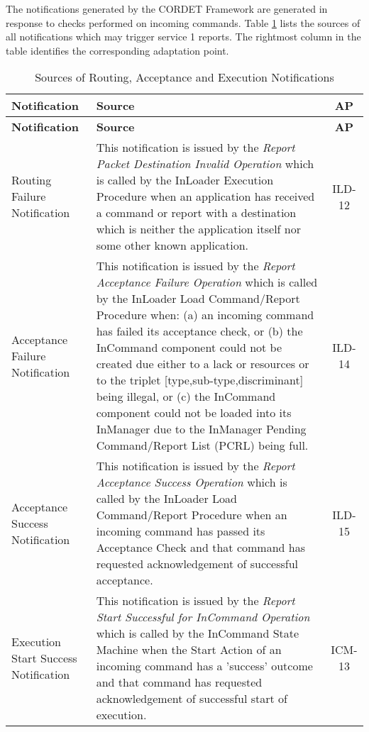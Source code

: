 \documentclass{pnp_article}
\begin{document}
The notifications generated by the CORDET Framework are generated in response to checks performed on incoming commands. Table \ref{tab:sourcesNotif} lists the sources of all notifications which may trigger service 1 reports. The rightmost column in the table identifies the corresponding adaptation point.



\begin{longtable}{|>{\raggedright\arraybackslash}p{2.1cm}|>{\raggedright\arraybackslash}p{9.8cm}|c|}
\caption{Sources of Routing, Acceptance and Execution Notifications}\label{tab:sourcesNotif} \\
\hline
\rowcolor{light-gray}
\textbf{Notification} & \textbf{Source} & \textbf{AP} \\
\hline\hline
\endfirsthead
\rowcolor{light-gray}
\textbf{Notification} & \textbf{Source} & \textbf{AP} \\
\hline\hline
\endhead
Routing Failure Notification & This notification is issued by the \textit{Report Packet Destination Invalid Operation} which is called by the InLoader Execution Procedure when an application has received a command or report with a destination which is neither the application itself nor some other known application. & ILD-12 \\
\hline
Acceptance Failure Notification & This notification is issued by the \textit{Report Acceptance Failure Operation} which is called by the InLoader Load Command/Report Procedure when: (a) an incoming command has failed its acceptance check, or (b) the InCommand component could not be created due either to a lack or resources or to the triplet [type,sub-type,discriminant] being illegal, or (c) the InCommand component could not be loaded into its InManager due to the InManager Pending Command/Report List (PCRL) being full. & ILD-14 \\
\hline
Acceptance Success Notification & This notification is issued by the \textit{Report Acceptance Success Operation} which is called by the InLoader Load Command/Report Procedure when an incoming command has passed its Acceptance Check and that command has requested acknowledgement of successful acceptance. & ILD-15 \\
\hline
Execution Start Success Notification &  This notification is issued by the \textit{Report Start Successful for InCommand Operation} which is called by the InCommand State Machine when the Start Action of an incoming command has a 'success' outcome and that command has requested acknowledgement of successful start of execution. & ICM-13 \\

\end{longtable}
\end{document}

